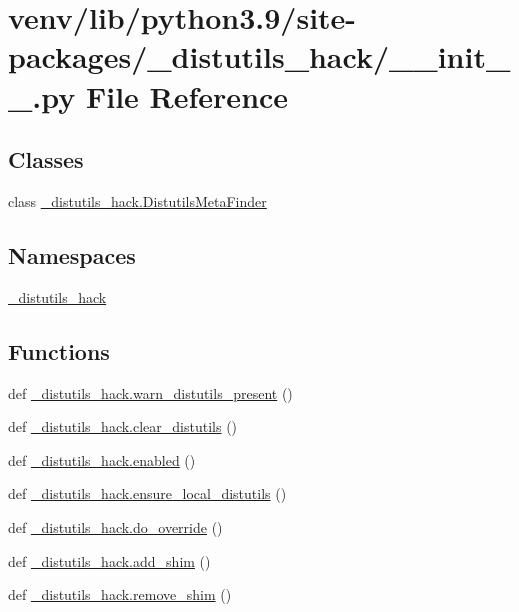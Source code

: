 \hypertarget{venv_2lib_2python3_89_2site-packages_2__distutils__hack_2____init_____8py}{}\section{venv/lib/python3.9/site-\/packages/\+\_\+distutils\+\_\+hack/\+\_\+\+\_\+init\+\_\+\+\_\+.py File Reference}
\label{venv_2lib_2python3_89_2site-packages_2__distutils__hack_2____init_____8py}
\subsection*{Classes}
\begin{DoxyCompactItemize}
\item 
class \hyperlink{class__distutils__hack_1_1DistutilsMetaFinder}{\+\_\+distutils\+\_\+hack.\+Distutils\+Meta\+Finder}
\end{DoxyCompactItemize}
\subsection*{Namespaces}
\begin{DoxyCompactItemize}
\item 
 \hyperlink{namespace__distutils__hack}{\+\_\+distutils\+\_\+hack}
\end{DoxyCompactItemize}
\subsection*{Functions}
\begin{DoxyCompactItemize}
\item 
def \hyperlink{namespace__distutils__hack_a5da1217b890631529734c429b90eaadd}{\+\_\+distutils\+\_\+hack.\+warn\+\_\+distutils\+\_\+present} ()
\item 
def \hyperlink{namespace__distutils__hack_ac28df4321677f0863bfbb1e2b73c7002}{\+\_\+distutils\+\_\+hack.\+clear\+\_\+distutils} ()
\item 
def \hyperlink{namespace__distutils__hack_ab663f05918d0530087fdd91ff583aa39}{\+\_\+distutils\+\_\+hack.\+enabled} ()
\item 
def \hyperlink{namespace__distutils__hack_a65ef964befed1f319c1b0c7244caf027}{\+\_\+distutils\+\_\+hack.\+ensure\+\_\+local\+\_\+distutils} ()
\item 
def \hyperlink{namespace__distutils__hack_a4d3597db607bf8a6ccc19fa89f2746f6}{\+\_\+distutils\+\_\+hack.\+do\+\_\+override} ()
\item 
def \hyperlink{namespace__distutils__hack_a08c2f18dc39845f0f7198d0b68299660}{\+\_\+distutils\+\_\+hack.\+add\+\_\+shim} ()
\item 
def \hyperlink{namespace__distutils__hack_acb451667220b32f50838b9e69508212d}{\+\_\+distutils\+\_\+hack.\+remove\+\_\+shim} ()
\end{DoxyCompactItemize}
